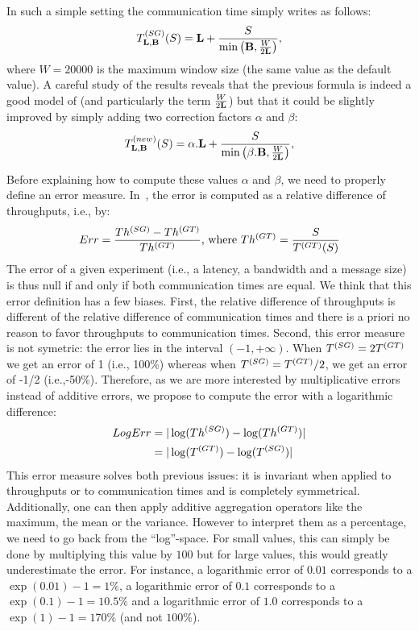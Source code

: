 \documentclass{sig-alternate}
\def\ie{i.e.,\xspace}
\begin{document}
In such a simple setting the \simgrid communication time
\tSG[\LOneLink,\BOneLink] simply writes as follows:
\begin{equation}
  \label{eq:t_sg}
  \tSG[\LOneLink,\BOneLink](S) = \LOneLink +
  \frac{S}{\min\left(\BOneLink, \frac{W}{2\LOneLink}\right)},
\end{equation}
where $W=20000$ is the maximum window size (the same value as the
default \gtnets value). A careful study of the results reveals that
the previous formula is indeed a good model of
\tGT[\LOneLink,\BOneLink] (and particularly the term
$\frac{W}{2\mathbf{L}}$) but that it could be slightly improved by
simply adding two correction factors $\alpha$ and $\beta$:
\begin{equation}
  \label{eq:t_sg_new}
  \tSGN[\LOneLink,\BOneLink](S) = \alpha.\LOneLink +
  \frac{S}{\min\left(\beta.\BOneLink, \frac{W}{2\LOneLink}\right)},
\end{equation}

Before explaining how to compute these values $\alpha$ and $\beta$, we
need to properly define an error measure. In~\cite{nstools07}, the
error is computed as a relative difference of throughputs, \ie by:
\begin{equation}
  \label{eq:rel_err}
  Err = \frac{\thSG-\thGT}{\thGT}\text{, where } 
  \thGT=\frac{S}{\tGT(S)}
\end{equation}
The error of a given experiment (\ie a latency, a bandwidth and a
message size) is thus null if and only if both communication times are equal. We
think that this error definition has a few biases. First, the relative
difference of throughputs is different of the relative difference of
communication times and there is a priori no reason to favor
throughputs to communication times. Second, this error measure is not
symetric: the error lies in the interval $(-1,+\infty)$. When
$T_{}^{(SG)}=2T_{}^{(GT)}$ we get an error of 1 (\ie 100\%) whereas when
$T_{}^{(SG)}=T_{}^{(GT)}/2$, we get an error of -1/2 (\ie -50\%). Therefore, as we
are more interested by multiplicative errors instead of additive
errors, we propose to compute the error with a logarithmic difference:
\begin{equation}
  \label{eq:rel_err_new}
  \begin{split}
    LogErr & = |\log(\thSG)-\log(\thGT)| \\
    & = |\log(\tGT)-\log(\tSG)|
  \end{split}
\end{equation}
This error measure solves both previous issues: it is invariant when
applied to throughputs or to communication times and is completely
symmetrical. Additionally, one can then apply additive aggregation
operators like the maximum, the mean or the variance. However to
interpret them as a percentage, we need to go back from the
``log''-space. For small values, this can simply be done by
multiplying this value by $100$ but for large values, this would
greatly underestimate the error. For instance, a logarithmic error of
$0.01$ corresponds to a $\exp(0.01)-1=1\%$, a logarithmic error of
$0.1$ corresponds to a $\exp(0.1)-1=10.5\%$ and a logarithmic error of
$1.0$ corresponds to a $\exp(1)-1=170\%$ (and not $100\%$).
\end{document}
